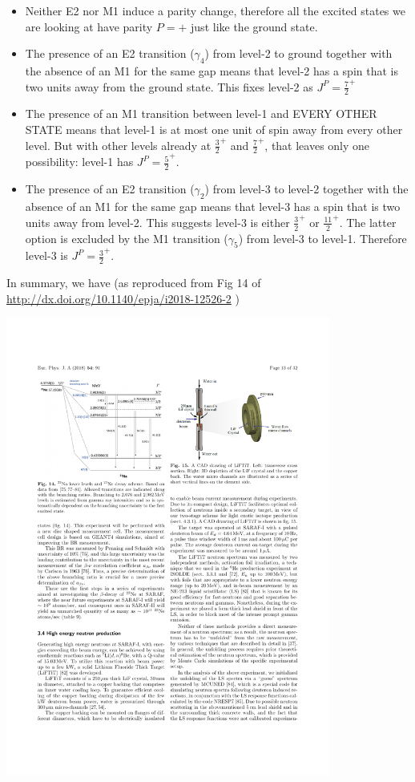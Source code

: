 \documentclass[txfonts]{NSTexam}
\begin{document}
\begin{questions}
{\begin{allparts}
\begin{itemize}
\item
Neither E2 nor M1 induce a parity change, therefore all the excited states we are looking at have parity $P=+$ just like the ground state.
\item
The presence of an E2 transition ($\gamma_4$) from level-2 to ground together with the absence of an M1 for the same gap means that level-2 has a spin that is two units away from the ground state.  This fixes level-2 as $J^P={\frac 7 2}^+$
\item
The presence of an M1 transition between level-1 and EVERY OTHER STATE means that level-1 is at most one unit of spin away from every other level. But with other levels already at ${\frac 3 2}^+$ and ${\frac 7 2}^+$, that leaves only one possibility: level-1 has $J^P={\frac 5 2}^+$.
\item
The presence of an E2 transition ($\gamma_2$) from level-3 to level-2 together with the absence of an M1 for the same gap means that level-3 has a spin that is two units away from level-2.  This suggests level-3 is either  ${\frac 3 2}^+$ or ${\frac {11} 2}^+$.  The latter option is excluded by the M1 transition ($\gamma_5$) from level-3 to level-1.  Therefore level-3 is $J^P={\frac 3 2}^+$.
\end{itemize}
In summary, we have (as reproduced from Fig 14 of \url{http://dx.doi.org/10.1140/epja/i2018-12526-2} )

\includegraphics[width=0.8\textwidth]{Images/23Na_spectrum_from_paper.pdf}


\end{allparts}}
\end{questions}
\end{document}
